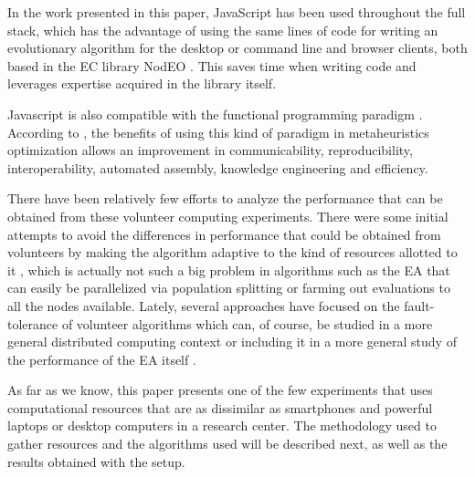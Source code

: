 \documentclass[journal,onecolumn]{IEEEtran}
\begin{document}
In the work presented in this paper, JavaScript has been used throughout the full 
stack, which has the advantage of using the same lines of code for
writing an evolutionary algorithm for the
desktop or command line and browser clients, both based in the EC
library NodEO \cite{DBLP:conf/gecco/GuervosVGES14}. This saves time
when writing code and leverages %
expertise acquired in the library itself. %

Javascript is also compatible with the functional programming paradigm \cite{Cousineau1998,MacLennan1990,Thompson1996}. 
According to \cite{swanresearch2015}, the benefits of using this kind of paradigm in 
metaheuristics optimization allows an improvement in communicability, 
reproducibility, interoperability, automated assembly, knowledge engineering 
and efficiency. 

There have been relatively few efforts to analyze the
performance that can be obtained from these volunteer computing
experiments. 
There were some initial attempts to avoid the differences in performance
that could be obtained from volunteers  by making
the algorithm adaptive to the kind of resources allotted to it
\cite{milani2004online}, which is actually not such a big problem in
algorithms such as the EA that can easily be
parallelized via population splitting or farming out evaluations to all
the nodes available. Lately, several approaches have focused on the
fault-tolerance of volunteer algorithms
\cite{gonzalez2010characterizing} which can, of course, be studied in
a more general distributed computing context
\cite{nogueras2015studying} or including it in a more general study of the
performance of the EA itself
\cite{DBLP:journals/gpem/LaredoBGVAGF14}. 


As far as we know, this paper presents one of the few experiments that
uses computational 
resources that are as dissimilar as smartphones and powerful laptops
or desktop computers in a research center. The methodology used to
gather resources and the algorithms used will be described next, as
well as the results obtained with the setup.
\end{document}
